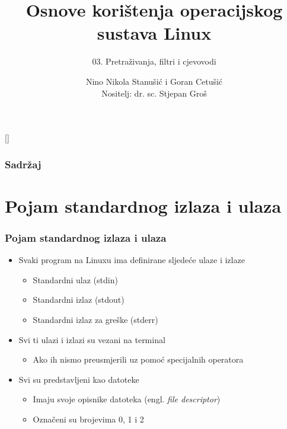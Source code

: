 \documentclass{beamer}
\title{Osnove korištenja operacijskog sustava Linux}
\subtitle{03. Pretraživanja, filtri i cjevovodi}
\author[Nino Nikola Stanušić i Goran Cetušić]{Nino Nikola Stanušić i Goran Cetušić\\{\small Nositelj: dr. sc. Stjepan Groš}}
\institute[FER]{Sveučilište u Zagrebu \\
				Fakultet elektrotehnike i računarstva}
\date{\todayiso}
\begin{document}
{
[] %

\begin{frame}
\maketitle
\end{frame}
}

\begin{frame}
\frametitle{Sadržaj}
\tableofcontents
\end{frame}

\section{Pojam standardnog izlaza i ulaza}
\begin{frame}[t]
\frametitle{Pojam standardnog izlaza i ulaza}
\begin{itemize}
  \item Svaki program na Linuxu ima definirane sljedeće ulaze i izlaze
  \begin{itemize}
    \item Standardni ulaz (stdin)
    \item Standardni izlaz (stdout)
    \item Standardni izlaz za greške (stderr)
  \end{itemize}
  \item Svi ti ulazi i izlazi su vezani na terminal
  \begin{itemize}
    \item Ako ih nismo preusmjerili uz pomoć specijalnih operatora
  \end{itemize}
  \item Svi su predstavljeni kao datoteke
  \begin{itemize}
    \item Imaju svoje opisnike datoteka (engl. \emph{file descriptor})
    \item Označeni su brojevima 0, 1 i 2
  \end{itemize}
\end{itemize}
\end{frame}
\end{document}

